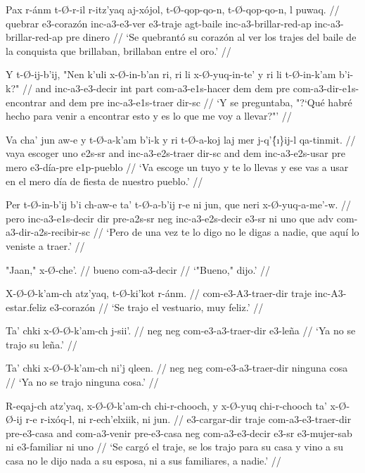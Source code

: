 \documentclass[12pt]{article}
\begin{document}
\ex
\begingl 
  \gla Pax r-\'anm t-\O-r-il r-itz'yaq aj-x\'ojol, t-\O-qop-qo-n, t-\O-qop-qo-n, l puwaq. //
  \glb quebrar e3-coraz\'on inc-a3-e3-ver e3-traje agt-baile inc-a3-brillar-red-ap inc-a3-brillar-red-ap pre dinero //
  \glft `Se quebrant\'o su coraz\'on al ver los trajes del baile de la conquista que brillaban, brillaban entre el oro.' //
\endgl
\xe

\ex
\begingl
  \gla Y t-\O-ij-b'ij, "Nen k'uli x-\O-in-b'an ri, ri li x-\O-yuq-in-te' y ri li t-\O-in-k'am b'i-k?" //
  \glb and inc-a3-e3-decir int part com-a3-e1s-hacer dem dem pre com-a3-dir-e1s-encontrar and dem pre inc-a3-e1s-traer dir-sc //
  \glft `Y se preguntaba, "?`Qu\'e habr\'e hecho para venir a encontrar esto y es lo que me voy a llevar?"' //
\endgl
\xe

\ex
\begingl
  \gla Va cha' jun aw-e y t-\O-a-k'am b'i-k y ri t-\O-a-koj laj mer j-q'\'\{\i\}ij-l qa-tinmit. //
  \glb vaya escoger uno e2s-sr and inc-a3-e2s-traer dir-sc and dem inc-a3-e2s-usar pre mero e3-d\'ia-pre e1p-pueblo //
  \glft `Va escoge un tuyo y te lo llevas y ese vas a usar en el mero d\'ia de fiesta de nuestro pueblo.' //
\endgl
\xe

\ex
\begingl
  \gla  Per t-\O-in-b'ij b'i ch-aw-e ta' t-\O-a-b'ij r-e ni jun, que neri x-\O-yuq-a-me'-w. //
  \glb pero inc-a3-e1s-decir dir pre-a2s-sr neg inc-a3-e2s-decir e3-sr ni uno que adv com-a3-dir-a2s-recibir-sc //
  \glft `Pero de una vez te lo digo no le digas a nadie, que aqu\'i lo veniste a traer.' //
\endgl
\xe

\ex
\begingl
  \gla  "Jaan," x-\O-che'. //
  \glb  bueno com-a3-decir //
  \glft `"Bueno," dijo.' //
\endgl
\xe

\ex
\begingl
  \gla  X-\O-\O-k'am-ch atz'yaq, t-\O-ki'kot r-\'anm. //
  \glb  com-e3-A3-traer-dir traje inc-A3-estar.feliz e3-coraz\'on //
  \glft `Se trajo el vestuario, muy feliz.' //
\endgl
\xe

\ex
\begingl
  \gla  Ta' chki x-\O-\O-k'am-ch j-sii'. //
  \glb neg neg com-e3-a3-traer-dir e3-le\~na //
  \glft `Ya no se trajo su le\~na.' //
\endgl
\xe

\ex
\begingl
  \gla  Ta' chki x-\O-\O-k'am-ch ni'j qleen. //
  \glb  neg neg com-e3-a3-traer-dir ninguna cosa //
  \glft `Ya no se trajo ninguna cosa.' //
\endgl
\xe


\ex
\begingl
  \gla R-eqaj-ch atz'yaq, x-\O-\O-k'am-ch chi-r-chooch, y x-\O-yuq chi-r-chooch ta' x-\O-\O-ij r-e r-ix\'oq-l, ni r-ech'elxiik, ni jun. //
  \glb e3-cargar-dir traje com-a3-e3-traer-dir pre-e3-casa and com-a3-venir pre-e3-casa neg com-a3-e3-decir e3-sr e3-mujer-sab ni e3-familiar ni uno //
  \glft `Se carg\'o el traje, se los trajo para su casa y vino a su casa no le dijo nada a su esposa, ni a sus familiares, a nadie.' //
\endgl
\xe
\end{document}
